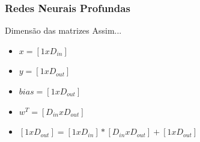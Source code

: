 \documentclass{beamer}
\begin{document}
\begin{frame}
	\frametitle{Redes Neurais Profundas}
	\begin{block}{Dimensão das matrizes}
		Assim...
		\begin{itemize}
			\item $x = [1x D_{in}]$
			\item $y = [1x D_{out}]$
			\item $bias = [1x D_{out}]$
			\item $w^T = [D_{in} x D_{out}]$
			\item $[1x D_{out}] = [1 x D_{in}] * [D_{in} x D_{out}] + [1x D_{out}]$
		\end{itemize}
	\end{block}
\end{frame}
\end{document}

